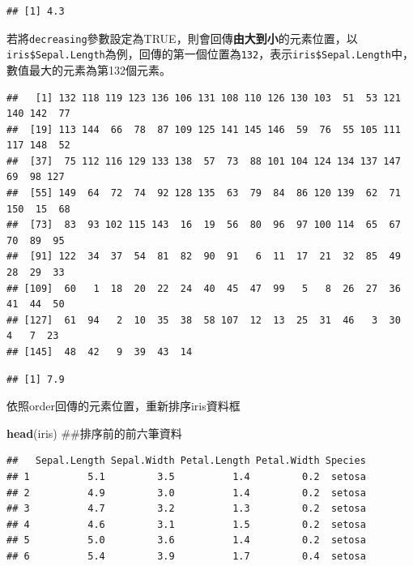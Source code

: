 \documentclass[]{book}
\newenvironment{Shaded}{\begin{snugshade}}{\end{snugshade}}
\newcommand{\KeywordTok}[1]{\textcolor[rgb]{0.13,0.29,0.53}{\textbf{{#1}}}}
\newcommand{\DataTypeTok}[1]{\textcolor[rgb]{0.13,0.29,0.53}{{#1}}}
\newcommand{\DecValTok}[1]{\textcolor[rgb]{0.00,0.00,0.81}{{#1}}}
\newcommand{\NormalTok}[1]{{#1}}
\theoremstyle{definition}
\theoremstyle{definition}
\theoremstyle{remark}
\begin{document}
\begin{verbatim}
## [1] 4.3
\end{verbatim}

若將\texttt{decreasing}參數設定為TRUE，則會回傳\textbf{由大到小}的元素位置，以\texttt{iris\$Sepal.Length}為例，回傳的第一個位置為\texttt{132}，表示\texttt{iris\$Sepal.Length}中，數值最大的元素為第132個元素。

\begin{Shaded}
\end{Shaded}

\begin{verbatim}
##   [1] 132 118 119 123 136 106 131 108 110 126 130 103  51  53 121 140 142  77
##  [19] 113 144  66  78  87 109 125 141 145 146  59  76  55 105 111 117 148  52
##  [37]  75 112 116 129 133 138  57  73  88 101 104 124 134 137 147  69  98 127
##  [55] 149  64  72  74  92 128 135  63  79  84  86 120 139  62  71 150  15  68
##  [73]  83  93 102 115 143  16  19  56  80  96  97 100 114  65  67  70  89  95
##  [91] 122  34  37  54  81  82  90  91   6  11  17  21  32  85  49  28  29  33
## [109]  60   1  18  20  22  24  40  45  47  99   5   8  26  27  36  41  44  50
## [127]  61  94   2  10  35  38  58 107  12  13  25  31  46   3  30   4   7  23
## [145]  48  42   9  39  43  14
\end{verbatim}

\begin{Shaded}
\end{Shaded}

\begin{verbatim}
## [1] 7.9
\end{verbatim}

依照order回傳的元素位置，重新排序iris資料框

\begin{Shaded}
\begin{Highlighting}[]
\KeywordTok{head}\NormalTok{(iris) ##排序前的前六筆資料}
\end{Highlighting}
\end{Shaded}

\begin{verbatim}
##   Sepal.Length Sepal.Width Petal.Length Petal.Width Species
## 1          5.1         3.5          1.4         0.2  setosa
## 2          4.9         3.0          1.4         0.2  setosa
## 3          4.7         3.2          1.3         0.2  setosa
## 4          4.6         3.1          1.5         0.2  setosa
## 5          5.0         3.6          1.4         0.2  setosa
## 6          5.4         3.9          1.7         0.4  setosa
\end{verbatim}
\end{document}
